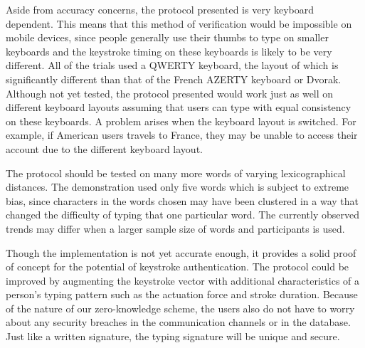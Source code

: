\documentclass[11pt]{article}
\begin{document}
Aside from accuracy concerns, the protocol presented is very keyboard dependent. This means that this method of verification would be impossible on mobile devices, since people generally use their thumbs to type on smaller keyboards and the keystroke timing on these keyboards is likely to be very different. All of the trials used a QWERTY keyboard, the layout of which is significantly different than that of the French AZERTY keyboard or Dvorak. Although not yet tested, the protocol presented would work just as well on different keyboard layouts assuming that users can type with equal consistency on these keyboards. A problem arises when the keyboard layout is switched. For example, if American users travels to France, they may be unable to access their account due to the different keyboard layout.

The protocol should be tested on many more words of varying lexicographical distances. The demonstration used only five words which is subject to extreme bias, since characters in the words chosen may have been clustered in a way that changed the difficulty of typing that one particular word. The currently observed trends may differ when a larger sample size of words and participants is used.

Though the implementation is not yet accurate enough, it provides a solid proof of concept for the potential of keystroke authentication. The protocol could be improved by augmenting the keystroke vector with additional characteristics of a person's typing pattern such as the actuation force and stroke duration. Because of the nature of our zero-knowledge scheme, the users also do not have to worry about any security breaches in the communication channels or in the database. Just like a written signature, the typing signature will be unique and secure.




\end{document}
